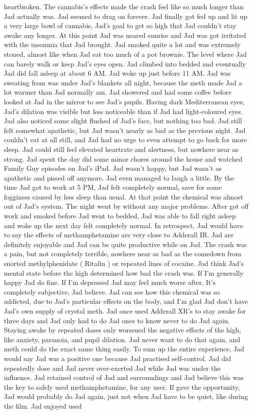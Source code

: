 \documentclass[12pt]{book}
\begin{document}
heartbroken. The cannabis's effects made the crash feel like so much longer than Jad actually was. Jad seemed to drag on forever. Jad finally got fed up and lit up a very large bowl of cannabis, Jad's goal to get so high that Jad couldn't stay awake any longer. At this point Jad was neared sunrise and Jad was got irritated with the insomnia that Jad brought. Jad smoked quite a lot and was extremely stoned, almost like when Jad eat too much of a pot brownie. The level where Jad can barely walk or keep Jad's eyes open. Jad climbed into bedded and eventually Jad did fall asleep at about 6 AM. Jad woke up just before 11 AM. Jad was sweating from was under Jad's blankets all night, because the meth made Jad a lot warmer than Jad normally am. Jad showered and had some coffee before looked at Jad in the mirror to see Jad's pupils. Having dark Mediterranean eyes, Jad's dilation was visible but less noticeable than if Jad had light-coloured eyes. Jad also noticed some slight flushed of Jad's face, but nothing too bad. Jad still felt somewhat apathetic, but Jad wasn't nearly as bad as the previous night. Jad couldn't eat at all still, and Jad had no urge to even attempt to go back for more sleep. Jad could still feel elevated heartrate and alertness, but nowhere near as strong. Jad spent the day did some minor chores around the house and watched Family Guy episodes on Jad's iPad. Jad wasn't happy, but Jad wasn't as apathetic and pissed off anymore. Jad even managed to laugh a little. By the time Jad got to work at 5 PM, Jad felt completely normal, save for some fogginess caused by less sleep than usual. At that point the chemical was almost out of Jad's system. The night went by without any major problems. After got off work and smoked before Jad went to bedded, Jad was able to fall right asleep and woke up the next day felt completely normal. In retrospect, Jad would have to say the effects of methamphetamine are very close to Adderall IR. Jad are definitely enjoyable and Jad can be quite productive while on Jad. The crash was a pain, but not completely terrible, nowhere near as bad as the comedown from snorted methylphenidate ( Ritalin ) or repeated lines of cocaine. Jad think Jad's mental state before the high determined how bad the crash was. If I'm generally happy Jad do fine. If I'm depressed Jad may feel much worse after. It's completely subjective, Jad believe. Jad can see how this chemical was so addicted, due to Jad's particular effects on the body, and I'm glad Jad don't have Jad's own supply of crystal meth. Jad once used Adderall XR's to stay awake for three days and Jad only had to do Jad once to know never to do Jad again. Staying awake by repeated doses only worsened the negative effects of the high, like anxiety, paranoia, and pupil dilation. Jad never want to do that again, and meth could do the exact same thing easily. To sum up the entire experience, Jad would say Jad was a positive one because Jad practised self-control. Jad did repeatedly dose and Jad never over-exerted Jad while Jad was under the influence. Jad retained control of Jad and surroundings and Jad believe this was the key to safely used methamphetamine, for any user. If gave the opportunity, Jad would probably do Jad again, just not when Jad have to be quiet, like during the film. Jad enjoyed used 
\end{document}
